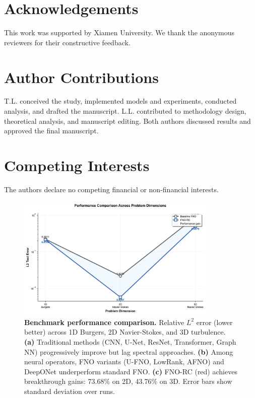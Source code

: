 \documentclass[11pt]{article}
\begin{document}
\section*{Acknowledgements}
This work was supported by Xiamen University. We thank the anonymous reviewers for their constructive feedback.

\section*{Author Contributions}
T.L. conceived the study, implemented models and experiments, conducted analysis, and drafted the manuscript. L.L. contributed to methodology design, theoretical analysis, and manuscript editing. Both authors discussed results and approved the final manuscript.

\section*{Competing Interests}
The authors declare no competing financial or non-financial interests.




\clearpage

\begin{figure}[t]
\centering
\includegraphics[width=0.85\textwidth]{figures/performance_comparison.png}
\caption{\textbf{Benchmark performance comparison.} Relative $L^2$ error (lower better) across 1D Burgers, 2D Navier-Stokes, and 3D turbulence. \textbf{(a)} Traditional methods (CNN, U-Net, ResNet, Transformer, Graph NN) progressively improve but lag spectral approaches. \textbf{(b)} Among neural operators, FNO variants (U-FNO, LowRank, AFNO) and DeepONet underperform standard FNO. \textbf{(c)} FNO-RC (red) achieves breakthrough gains: 73.68\% on 2D, 43.76\% on 3D. Error bars show standard deviation over runs.}
\label{fig:performance}
\end{figure}
\end{document}
